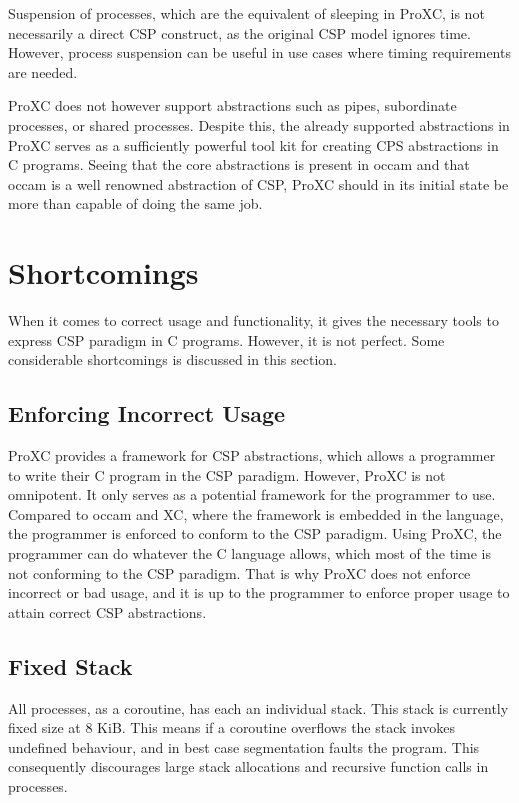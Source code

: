 Suspension of processes, which are the equivalent of sleeping in ProXC, is not necessarily a direct CSP construct, as the original CSP model ignores time. However, process suspension can be useful in use cases where timing requirements are needed.

ProXC does not however support abstractions such as pipes, subordinate processes, or sha\-red processes. Despite this, the already supported abstractions in ProXC serves as a sufficiently powerful tool kit for creating CPS abstractions in C programs. Seeing that the core abstractions is present in occam and that occam is a well renowned abstraction of CSP, ProXC should in its initial state be more than capable of doing the same job. 

\section{Shortcomings}

When it comes to correct usage and functionality, it gives the necessary tools to express CSP paradigm in C programs. However, it is not perfect. Some considerable shortcomings is discussed in this section. 

\subsection{Enforcing Incorrect Usage}

ProXC provides a framework for CSP abstractions, which allows a programmer to write their C program in the CSP paradigm. However, ProXC is not omnipotent. It only serves as a potential framework for the programmer to use. Compared to occam and XC, where the framework is embedded in the language, the programmer is enforced to conform to the CSP paradigm. Using ProXC, the programmer can do whatever the C language allows, which most of the time is not conforming to the CSP paradigm. That is why ProXC does not enforce incorrect or bad usage, and it is up to the programmer to enforce proper usage to attain correct CSP abstractions.

\subsection{Fixed Stack}

All processes, as a coroutine, has each an individual stack. This stack is currently fixed size at 8 KiB. This means if a coroutine overflows the stack invokes undefined behaviour, and in best case segmentation faults the program. This consequently discourages large stack allocations and recursive function calls in processes.

